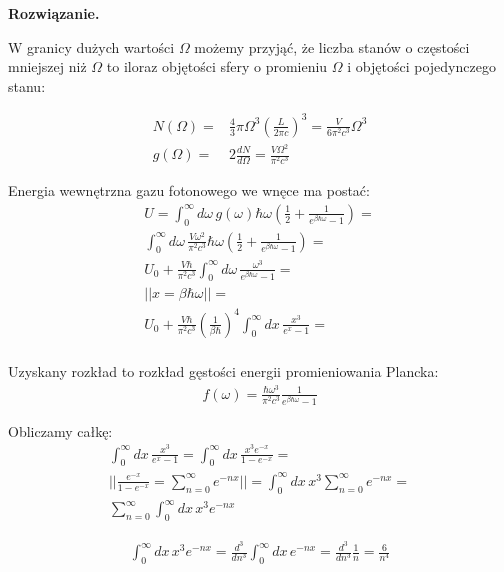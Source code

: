 \documentclass[11pt,a4paper]{article}
\newenvironment{solution}{\vspace{1cm} \par\textbf{Rozwiązanie.} \vspace{1cm}}{}
\begin{document}
\begin{solution}
\vskip 0.5cm

W granicy dużych wartości $\Omega$ możemy przyjąć, że liczba stanów 
o częstości mniejszej niż $\Omega$ to iloraz objętości sfery o promieniu 
$\Omega$ i objętości pojedynczego stanu:

\begin{align*}
  N(\Omega) =&  \frac{4}{3} \pi \Omega^{3}  \left( \frac{L}{2\pi c} \right)^3 =
  \frac{V}{6\pi^2 c^3} \Omega^3 \\
  g(\Omega) =& 2\frac{dN}{d\Omega} = \frac{V \Omega^{2}}{\pi^2 c^3}
\end{align*}

Energia wewnętrzna gazu fotonowego we wnęce ma postać:
\begin{align*}
  U = \int_0^{\infty} d\omega \, g(\omega) \hbar \omega \left( \frac{1}{2} + \frac{1}{e^{\beta \hbar \omega} - 1} \right) = \\
  \int_0^{\infty} d\omega \, \frac{V \omega^{2}}{\pi^2 c^3} \hbar \omega \left( \frac{1}{2} + \frac{1}{e^{\beta \hbar \omega} - 1} \right) = \\
  U_{0} + \frac{V \hbar}{\pi^2 c^3}\int_0^{\infty} d\omega \, \frac{\omega^3}{e^{\beta \hbar \omega} - 1} = \\
  || x = \beta \hbar \omega || = \\
   U_{0} +
  \frac{V \hbar}{\pi^2 c^3} \left( \frac{1}{\beta \hbar} \right)^4 \int_0^{\infty} dx \, \frac{x^3}{e^{x} - 1} = \\\
\end{align*}

Uzyskany rozkład to rozkład gęstości energii promieniowania Plancka:
\begin{align*}
  f(\omega) = \frac{\hbar \omega^3}{\pi^2 c^3} \frac{1}{e^{\beta \hbar \omega} - 1}
\end{align*}

Obliczamy całkę:
\begin{align*}
  \int_0^{\infty} dx \, \frac{x^3}{e^{x} - 1} = 
  \int_0^{\infty} dx \, \frac{x^3 e^{-x}}{1 - e^{-x}} = \\
  || \frac{e^{-x}}{1 - e^{-x}} = \sum_{n=0}^{\infty} e^{-nx} || =
  \int_0^{\infty} dx \, x^3 \sum_{n=0}^{\infty} e^{-nx} = \\
  \sum_{n=0}^{\infty} \int_0^{\infty} dx \, x^3 e^{-nx} 
\end{align*}

\begin{align*}
  \int_0^{\infty} dx \, x^3 e^{-nx} =
  \frac{d^3}{dn^3} \int_0^{\infty} dx \, e^{-nx} =
  \frac{d^3}{dn^3} \frac{1}{n} =
  \frac{6}{n^4}
\end{align*}


\end{solution}
\end{document}
